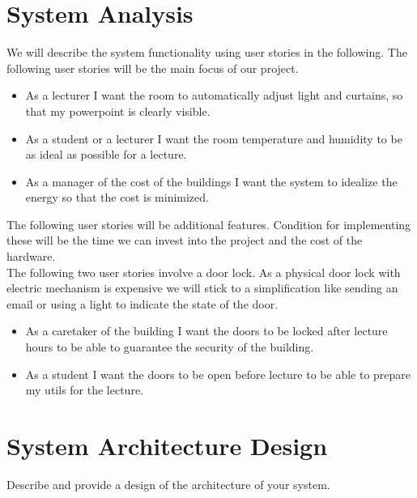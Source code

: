 \documentclass[runningheads]{llncs}
\begin{document}
\section{System Analysis}
We will describe the system functionality using user stories in the following. The following user stories will be the main focus of our project.\\
\begin{itemize}
\item As a lecturer I want the room to automatically adjust light and curtains, so that my powerpoint is clearly visible.\\

\item As a student or a lecturer I want the room temperature and humidity to be as ideal as possible for a lecture.\\

\item As a manager of the cost of the buildings I want the system to idealize the energy so that the cost is minimized.\\
\end{itemize}

The following user stories will be additional features. Condition for implementing these will be the time we can invest into the project and the cost of the hardware.\\ 

The following two user stories involve a door lock. As a physical door lock with electric mechanism is expensive we will stick to a simplification like sending an email or using a light to indicate the state of the door.\\
\begin{itemize}
\item As a caretaker of the building I want the doors to be locked after lecture hours to be able to guarantee the security of the building. \\

\item As a student I want the doors to be open before lecture to be able to prepare my utils for the lecture.\\
\end{itemize}

\section{System Architecture Design}
Describe and provide a design of the architecture of your system.
\end{document}
